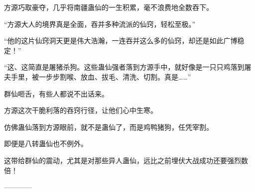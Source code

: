 \begin{this_body}
方源巧取豪夺，几乎将南疆蛊仙的一生积累，毫不浪费地全数吞下。

“方源大人的境界真是全面，吞并多种流派的仙窍，轻松至极。”

“他的这片仙窍洞天更是伟大浩瀚，一连吞并这么多的仙窍，却还是如此广博稳定！”

“这、这简直是屠猪杀狗。这些蛊仙强者落到方源手中，就好像是一只只鸡落到屠夫手里，被一步步割喉、放血、拔毛、清洗、切割。真是……”

群仙咂舌，有些人都说不出话来。

方源这次干脆利落的吞窍行径，让他们心中生寒。

仿佛蛊仙落到方源眼前，就不是蛊仙了，而是鸡鸭猪狗，任凭宰割。

即便是八转蛊仙也不例外。

这带给群仙的震动，尤其是对那些异人蛊仙，远比之前埋伏大战成功还要强烈数倍！

------------

\end{this_body}

